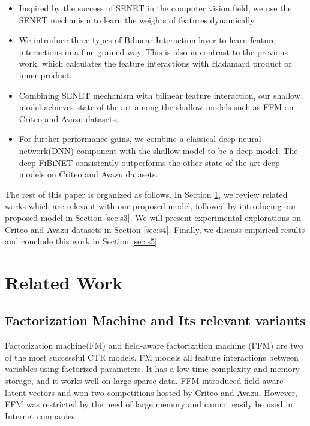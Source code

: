 \documentclass[sigconf]{acmart}
\begin{document}
\begin{itemize}
\item
  Inspired by the success of SENET in the computer vision field, we use the SENET mechanism to learn the weights of features dynamically.
\item
  We introduce three types of Bilinear-Interaction layer to learn
  feature interactions in a fine-grained way. This is also in contrast
  to the previous work\cite{juan2016field,juan2017field, xiao2017attentional, rendle2010factorization,rendle2012factorization,He2017NFM}, which calculates the feature interactions with Hadamard product or inner product.
\item
  Combining SENET mechanism with bilinear feature interaction, our shallow model achieves state-of-the-art among the shallow models such as FFM on Criteo and Avazu datasets.
\item
  For further performance gains, we combine a classical deep neural network(DNN) component with the shallow model to be a deep model. The deep FiBiNET consistently outperforms the other state-of-the-art deep models
  on Criteo and Avazu datasets.
\end{itemize}

The rest of this paper is organized as follows. In Section \ref{sec:s2}, we review
related works which are relevant with our proposed model, followed by
introducing our proposed model in Section \ref{sec:s3}. We will present
experimental explorations on Criteo and Avazu datasets in Section \ref{sec:s4}. Finally, we
discuss empirical results and conclude this work in Section \ref{sec:s5}. 

\section{Related Work}
\label{sec:s2}
\subsection{Factorization Machine and Its relevant variants}

Factorization machine(FM)\cite{rendle2010factorization,rendle2012factorization} and field-aware factorization machine (FFM)\cite{juan2016field,juan2017field} are two of the most successful CTR models. FM models all feature interactions between variables using factorized
parameters. It has a low time complexity and memory storage, and it
works well on large sparse data. FFM introduced field aware latent
vectors and won two competitions hosted by Criteo and Avazu\cite{juan2017field}.
However, FFM was restricted by the need of large memory and cannot
easily be used in Internet companies.
\end{document}
